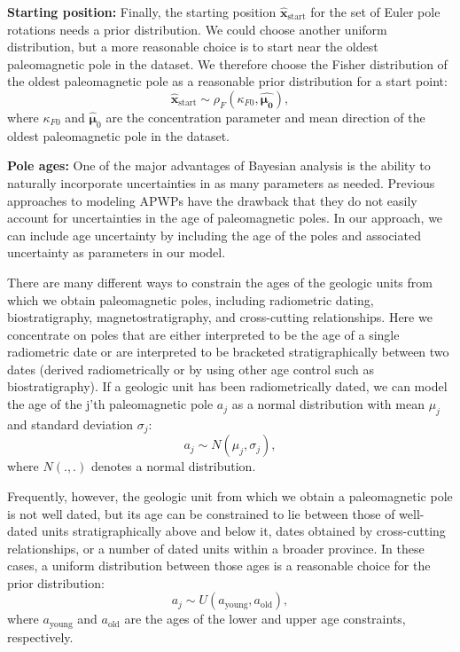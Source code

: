 \documentclass[]{agujournal2019}
\begin{document}
\textbf{Starting position:}
Finally, the starting position $\hat{\mathbf{x}}_\mathrm{start}$ for the set of Euler pole rotations needs a prior distribution. We could choose another uniform distribution, but a more reasonable choice is to start near the oldest paleomagnetic pole in the dataset. We therefore choose the Fisher distribution of the oldest paleomagnetic pole as a reasonable prior distribution for a start point:
\begin{equation}
\hat{\mathbf{x}}_\mathrm{start} \sim \rho_F(\kappa_{F0}, \hat{\mathbf{\mu_0}}),
\end{equation}
where $\kappa_{F0}$ and $\hat{\mathbf{\mu}}_0$ are the concentration parameter and mean direction of the oldest paleomagnetic pole in the dataset.

\textbf{Pole ages:}
One of the major advantages of Bayesian analysis is the ability to naturally incorporate uncertainties in as many parameters as needed. Previous approaches to modeling APWPs have the drawback that they do not easily account for uncertainties in the age of paleomagnetic poles. In our approach, we can include age uncertainty by including the age of the poles and associated uncertainty as parameters in our model.

There are many different ways to constrain the ages of the geologic units from which we obtain paleomagnetic poles, including radiometric dating, biostratigraphy, magnetostratigraphy, and cross-cutting relationships. Here we concentrate on poles that are either interpreted to be the age of a single radiometric date or are interpreted to be bracketed stratigraphically between two dates (derived radiometrically or by using other age control such as biostratigraphy). If a geologic unit has been radiometrically dated, we can model the age of the j'th paleomagnetic pole $a_j$ as a normal distribution with mean $\mu_j$ and standard deviation $\sigma_j$:
\begin{equation}
a_j \sim N(\mu_j, \sigma_j),
\end{equation}
where $N(.,.)$ denotes a normal distribution.

Frequently, however, the geologic unit from which we obtain a paleomagnetic pole is not well dated, but its age can be constrained to lie between those of well-dated units stratigraphically above and below it, dates obtained by cross-cutting relationships, or a number of dated units within a broader province. In these cases, a uniform distribution between those ages is a reasonable choice for the prior distribution:
\begin{equation}
a_j \sim U(a_\mathrm{young}, a_\mathrm{old}),
\end{equation}
where $a_\mathrm{young}$ and $a_\mathrm{old}$ are the ages of the lower and upper age constraints, respectively.
\end{document}
